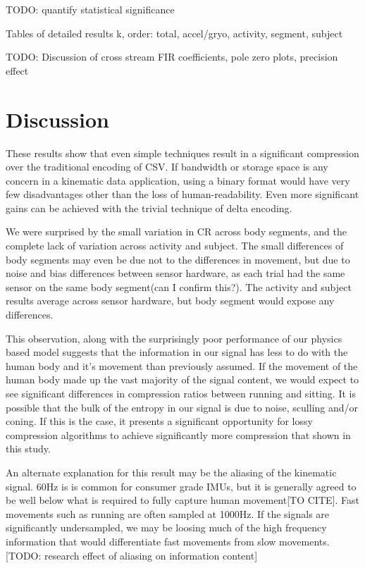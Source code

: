 \documentclass[journal]{IEEEtran}
\begin{document}
TODO: quantify statistical significance

Tables of detailed results k, order: total, accel/gryo, activity, segment, subject 

TODO: Discussion of cross stream FIR coefficients, pole zero plots, precision effect
\section{Discussion}

These results show that even simple techniques result in a significant compression over the traditional encoding of CSV. If bandwidth or storage space is any concern in a kinematic data application, using a binary format would have very few disadvantages other than the loss of human-readability. Even more significant gains can be achieved with the trivial technique of delta encoding.

We were surprised by the small variation in CR across body segments, and the complete lack of variation across activity and subject. The small differences of body segments may even be due not to the differences in movement, but due to noise and bias differences between sensor hardware, as each trial had the same sensor on the same body segment(can I confirm this?). The activity and subject results average across sensor hardware, but body segment would expose any differences.

This observation, along with the surprisingly poor performance of our physics based model suggests that the information in our signal has less to do with the human body and it's movement than previously assumed. If the movement of the human body made up the vast majority of the signal content, we would expect to see significant differences in compression ratios between running and sitting. It is possible that the bulk of the entropy in our signal is due to noise, sculling and/or coning. If this is the case, it presents a significant opportunity for lossy compression algorithms to achieve significantly more compression that shown in this study.

An alternate explanation for this result may be the aliasing of the kinematic signal. 60Hz is is common for consumer grade IMUs, but it is generally agreed to be well below what is required to fully capture human movement[TO CITE]. Fast movements such as running are often sampled at 1000Hz. If the signals are significantly undersampled, we may be loosing much of the high frequency information that would differentiate fast movements from slow movements. [TODO: research effect of aliasing on information content]
\end{document}
